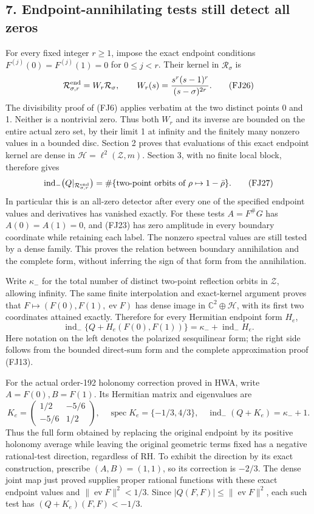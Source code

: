 \documentclass[
  10pt,
  a4paper,
]{article}
\begin{document}
\subsection{7. Endpoint-annihilating tests still detect all
zeros}\label{endpoint-annihilating-tests-still-detect-all-zeros}

For every fixed integer \(r\ge1\), impose the exact endpoint conditions
\(F^{(j)}(0)=F^{(j)}(1)=0\) for \(0\le j<r\). Their kernel in
\(\mathcal R_\sigma\) is \[
\mathcal R_{\sigma,r}^{\rm end}=W_r\mathcal R_\sigma,
\qquad W_r(s)=\frac{s^r(s-1)^r}{(s-\sigma)^{2r}}.
\tag{FJ26}
\] The divisibility proof of (FJ6) applies verbatim at the two distinct
points 0 and 1. Neither is a nontrivial zero. Thus both \(W_r\) and its
inverse are bounded on the entire actual zero set, by their limit 1 at
infinity and the finitely many nonzero values in a bounded disc. Section
2 proves that evaluations of this exact endpoint kernel are dense in
\(\mathcal H=\ell^2(\mathcal Z,m)\). Section 3, with no finite local
block, therefore gives \[
\operatorname{ind}_-\bigl(Q|_{\mathcal R_{\sigma,r}^{\rm end}}\bigr)
=\#\{\text{two-point orbits of }\rho\mapsto1-\bar\rho\}.
\tag{FJ27}
\] In particular this is an all-zero detector after every one of the
specified endpoint values and derivatives has vanished exactly. For
these tests \(A=F^\#G\) has \(A(0)=A(1)=0\), and (FJ23) has zero
amplitude in every boundary coordinate while retaining each label. The
nonzero spectral values are still tested by a dense family. This proves
the relation between boundary annihilation and the complete form,
without inferring the sign of that form from the annihilation.

Write \(\kappa_-\) for the total number of distinct two-point reflection
orbits in \(\mathcal Z\), allowing infinity. The same finite
interpolation and exact-kernel argument proves that
\(F\mapsto(F(0),F(1),\operatorname{ev}F)\) has dense image in
\(\mathbb C^2\oplus\mathcal H\), with its first two coordinates attained
exactly. Therefore for every Hermitian endpoint form \(H_e\), \[
\operatorname{ind}_-\{Q+H_e(F(0),F(1))\}
=\kappa_-+\operatorname{ind}_-H_e.
\tag{FJ28}
\] Here notation on the left denotes the polarized sesquilinear form;
the right side follows from the bounded direct-sum form and the complete
approximation proof (FJ13).

For the actual order-192 holonomy correction proved in HWA, write
\(A=F(0),B=F(1)\). Its Hermitian matrix and eigenvalues are \[
K_e=\begin{pmatrix}1/2&-5/6\\-5/6&1/2\end{pmatrix},
\quad \operatorname{spec}K_e=\{-1/3,4/3\},\quad
\operatorname{ind}_-(Q+K_e)=\kappa_-+1.
\tag{FJ29}
\] Thus the full form obtained by replacing the original endpoint by its
positive holonomy average while leaving the original geometric terms
fixed has a negative rational-test direction, regardless of RH. To
exhibit the direction by its exact construction, prescribe
\((A,B)=(1,1)\), so its correction is \(-2/3\). The dense joint map just
proved supplies proper rational functions with these exact endpoint
values and \(\|\operatorname{ev}F\|^2<1/3\). Since
\(|Q(F,F)|\le\|\operatorname{ev}F\|^2\), each such test has
\((Q+K_e)(F,F)<-1/3\).
\end{document}
